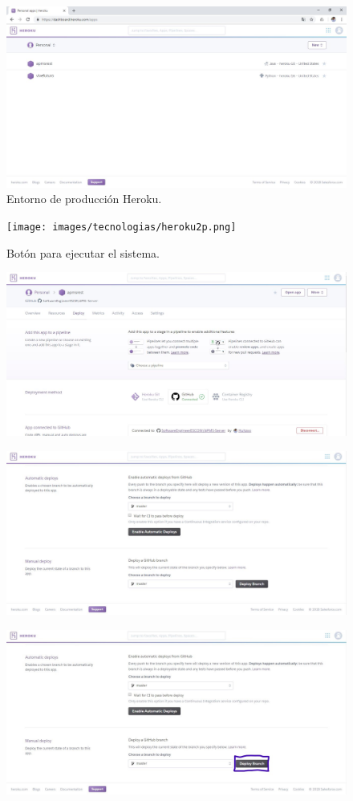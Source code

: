 \begin{figure}[H]
	\centering
	\includegraphics[width=0.7\linewidth]{images/tecnologias/heroku.JPG}
	\caption{Entorno de producción Heroku.}
\end{figure}


\begin{figure}[H]
	\centering
	\texttt{[image: images/tecnologias/heroku2p.png]}
	\caption{Botón para ejecutar el sistema.}
\end{figure}


\begin{figure}[H]
	\centering
	\includegraphics[width=0.7\linewidth]{images/tecnologias/heroku3.JPG}
\end{figure}


\begin{figure}[H]
	\centering
	\includegraphics[width=0.7\linewidth]{images/tecnologias/heroku4.JPG}
\end{figure}

\begin{figure}[H]
	\centering
	\includegraphics[width=0.7\linewidth]{images/tecnologias/heroku4p.JPG}
\end{figure}

